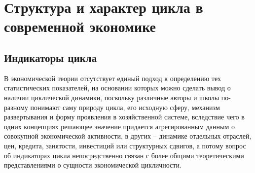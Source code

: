 \section{Структура и характер цикла в современной экономике}

\subsection{Индикаторы цикла} %
В экономической теории отсутствует единый подход к определению тех статистических показателей, на основании которых можно сделать вывод о наличии циклической динамики, поскольку различные авторы и школы по-разному понимают саму природу цикла, его исходную сферу, механизм развертывания и форму проявления в хозяйственной системе, вследствие чего в одних концепциях решающее значение придается агрегированным данным о совокупной экономической активности, в других – динамике отдельных отраслей, цен, кредита, занятости, инвестиций или структурных сдвигов, а потому вопрос об индикаторах цикла непосредственно связан с более общими теоретическими представлениями о сущности экономической цикличности.

